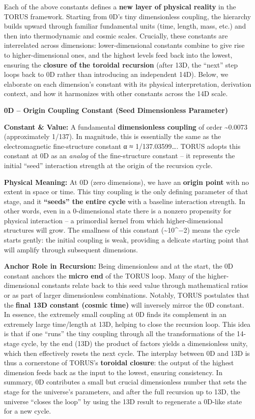 \documentclass[]{article}
\begin{document}
Each of the above constants defines a \textbf{new layer of physical
reality} in the TORUS framework. Starting from 0D's tiny dimensionless
coupling, the hierarchy builds upward through familiar fundamental units
(time, length, mass, etc.) and then into thermodynamic and cosmic
scales. Crucially, these constants are interrelated across dimensions:
lower-dimensional constants combine to give rise to higher-dimensional
ones, and the highest levels feed back into the lowest, ensuring the
\textbf{closure of the toroidal recursion} (after 13D, the ``next'' step
loops back to 0D rather than introducing an independent 14D)​. Below, we
elaborate on each dimension's constant with its physical interpretation,
derivation context, and how it harmonizes with other constants across
the 14D scale.

\textbf{0D -- Origin Coupling Constant (Seed Dimensionless Parameter)}

\textbf{Constant \& Value:} A fundamental \textbf{dimensionless
coupling} of order \textasciitilde{}0.0073 (approximately 1/137)​. In
magnitude, this is essentially the same as the electromagnetic
fine-structure constant α ≈ 1/137.03599\ldots{}​. TORUS adopts this
constant at 0D as an \emph{analog} of the fine-structure constant -- it
represents the initial ``seed'' interaction strength at the origin of
the recursion cycle.

\textbf{Physical Meaning:} At 0D (zero dimensions), we have an
\textbf{origin point} with no extent in space or time. This tiny
coupling is the only defining parameter of that stage, and it
\textbf{``seeds'' the entire cycle} with a baseline interaction
strength​. In other words, even in a 0-dimensional state there is a
nonzero propensity for physical interaction -- a primordial kernel from
which higher-dimensional structures will grow. The smallness of this
constant (\textasciitilde{}10\^{}−2) means the cycle starts gently: the
initial coupling is weak, providing a delicate starting point that will
amplify through subsequent dimensions​.

\textbf{Anchor Role in Recursion:} Being dimensionless and at the start,
the 0D constant anchors the \textbf{micro end} of the TORUS loop. Many
of the higher-dimensional constants relate back to this seed value
through mathematical ratios or as part of larger dimensionless
combinations. Notably, TORUS postulates that the \textbf{final 13D
constant (cosmic time)} will inversely mirror the 0D constant​. In
essence, the extremely small coupling at 0D finds its complement in an
extremely large time/length at 13D, helping to close the recursion loop.
This idea is that if one ``runs'' the tiny coupling through all the
transformations of the 14-stage cycle, by the end (13D) the product of
factors yields a dimensionless unity, which then effectively resets the
next cycle​. The interplay between 0D and 13D is thus a cornerstone of
TORUS's \textbf{toroidal closure}: the output of the highest dimension
feeds back as the input to the lowest, ensuring consistency. In summary,
0D contributes a small but crucial dimensionless number that sets the
stage for the universe's parameters, and after the full recursion up to
13D, the universe ``closes the loop'' by using the 13D result to
regenerate a 0D-like state for a new cycle​.
\end{document}
